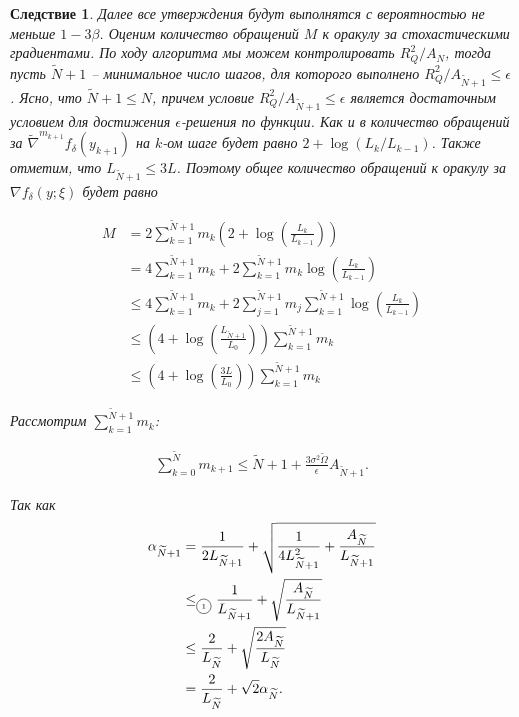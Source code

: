 \documentclass[11pt,a4]{article}
\newtheorem{corollary}{Следствие}
\newcommand*\circled[1]{\tikz[baseline=(char.base)]{
		\node[shape=circle,draw,inner sep=2pt] (char) {#1};}}
\begin{document}
\begin{corollary}
\leavevmode
Далее все утверждения будут выполнятся с вероятностью не меньше $1 - 3\beta$. Оценим количество обращений $M$ к оракулу за стохастическими градиентами. По ходу алгоритма мы можем контролировать $R_Q^2/A_N$, тогда пусть $\widetilde{N} + 1$ -- минимальное число шагов, для которого выполнено $R_Q^2/A_{\widetilde{N} + 1} \leq \epsilon$. Ясно, что $\widetilde{N} + 1 \leq N$, причем условие $R_Q^2/A_{\widetilde{N} + 1} \leq \epsilon$ является достаточным условием для достижения $\epsilon$-решения по функции. Как и в \cite{nesterov2015universal,gasnikov2018universal} количество обращений за $\widetilde{\nabla}^{m_{k+1}} f_\delta(y_{k+1})$ на $k$-ом шаге будет равно $2 + \log\left(L_k/L_{k-1}\right)$. Также отметим, что $L_{\widetilde{N} + 1} \leq 3L$. Поэтому общее количество обращений к оракулу за $\nabla f_\delta(y;\xi)$ будет равно

\begin{align*}
M &= 2\sum_{k=1}^{\widetilde{N} + 1}m_{k}\left(2 + \log\left(\frac{L_k}{L_{k-1}}\right)\right) \\&= 4\sum_{k=1}^{\widetilde{N} + 1}m_{k} + 2\sum_{k=1}^{\widetilde{N} + 1}m_{k}\log\left(\frac{L_k}{L_{k-1}}\right) \\&\leq
4\sum_{k=1}^{\widetilde{N} + 1}m_{k} + 2\sum_{j=1}^{\widetilde{N} + 1}m_{j}\sum_{k=1}^{\widetilde{N} + 1}\log\left(\frac{L_k}{L_{k-1}}\right) \\&\leq
\left(4 + \log\left(\frac{L_{\widetilde{N} + 1}}{L_0}\right)\right)\sum_{k=1}^{\widetilde{N} + 1}m_{k} \\&\leq \left(4 + \log\left(\frac{3L}{L_0}\right)\right)\sum_{k=1}^{\widetilde{N} + 1}m_{k}
\end{align*}

Рассмотрим $\sum_{k=1}^{\widetilde{N} + 1}m_{k}$:

\begin{gather*}
\sum_{k=0}^{\widetilde{N}}m_{k+1}\leq {\widetilde{N} + 1} + \frac{3\sigma^2\widetilde{\Omega}}{\epsilon}A_{\widetilde{N} + 1}.
\end{gather*}

Так как
\begin{align*}
\alpha_{\widetilde{N}+1} &= \frac{1}{2L_{\widetilde{N}+1}} + \sqrt{\frac{1}{4L_{\widetilde{N}+1}^2} + \frac{A_{\widetilde{N}}}{L_{\widetilde{N}+1}}} \\&\leq_{{\tiny \circled{1}}} \frac{1}{L_{\widetilde{N}+1}} + \sqrt{\frac{A_{\widetilde{N}}}{L_{\widetilde{N}+1}}} \\&\leq \frac{2}{L_{\widetilde{N}}} + \sqrt{\frac{2A_{\widetilde{N}}}{L_{\widetilde{N}}}} \\&= \frac{2}{L_{\widetilde{N}}} + \sqrt{2}\alpha_{\widetilde{N}}.
\end{align*}


\end{corollary}
\end{document}

